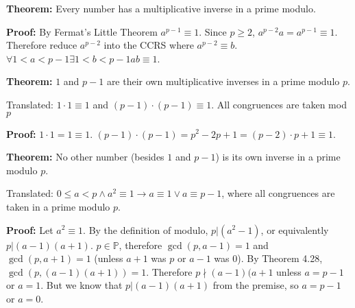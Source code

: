 \item \textbf{Theorem:} Every number has a multiplicative inverse in a prime modulo.

\textbf{Proof:} By Fermat's Little Theorem \(a^{p-1} \equiv 1\). Since \(p \geq 2\), \(a^{p-2} a = a^{p-1} \equiv 1\). Therefore reduce \(a^{p-2}\) into the CCRS where \(a^{p-2} \equiv b\). \(\forall 1 < a < p - 1 \exists 1 < b < p - 1 ab \equiv 1\). \qedhere

\item \textbf{Theorem:} \(1\) and \(p-1\) are their own multiplicative inverses in a prime modulo \(p\).

Translated: \(1 \cdot 1 \equiv 1\) and \((p-1) \cdot (p-1) \equiv 1\). All congruences are taken mod \(p\)

\textbf{Proof:} \(1 \cdot 1 = 1 \equiv 1\). \((p-1)\cdot(p-1) = p^2 - 2p + 1 = (p-2) \cdot p + 1 \equiv 1\). \qedhere

\item \textbf{Theorem:} No other number (besides \(1\) and \(p-1\)) is its own inverse in a prime modulo \(p\).

Translated: \(0 \leq a < p \wedge a^2 \equiv 1 \rightarrow a \equiv 1 \vee a \equiv p-1\), where all congruences are taken in a prime modulo \(p\).

\textbf{Proof:} Let \(a^2 \equiv 1\). By the definition of modulo, \(p|(a^2 - 1)\), or equivalently \(p|(a-1)(a+1)\). \(p \in \mathbb P\), therefore \(\gcd(p, a-1) = 1\) and \(\gcd(p, a+1) = 1\) (unless \(a+1\) was \(p\) or \(a-1\) was \(0\)). By Theorem 4.28, \(\gcd(p, (a-1)(a+1)) = 1\). Therefore \(p\nmid (a-1)(a+1\) unless \(a = p - 1\) or \(a = 1\). But we know that \(p|(a-1)(a+1)\) from the premise, so \(a = p-1\) or \(a = 0\). \qedhere



